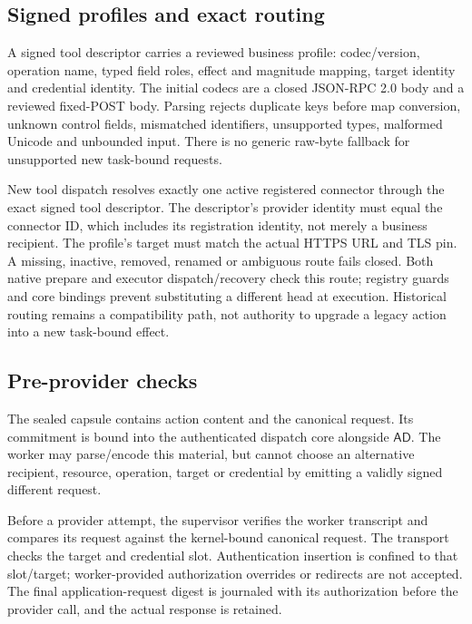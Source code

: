 \documentclass[letterpaper,twocolumn,10pt]{article}
\newcommand{\code}[1]{\texttt{\detokenize{#1}}}
\newcommand{\AD}{\ensuremath{\mathsf{AD}}}
\begin{document}
\subsection{Signed profiles and exact routing}

A signed tool descriptor carries a reviewed business profile: codec/version,
operation name, typed field roles, effect and magnitude mapping, target identity
and credential identity. The initial codecs are a closed JSON-RPC 2.0
\code{tools/call} body and a reviewed fixed-POST body. Parsing rejects duplicate
keys before map conversion, unknown control fields, mismatched identifiers,
unsupported types, malformed Unicode and unbounded input. There is no generic
raw-byte fallback for unsupported new task-bound requests.

New tool dispatch resolves exactly one active registered connector through the
exact signed tool descriptor. The descriptor's provider identity must equal
the connector ID, which includes its registration identity, not merely a
business recipient. The profile's target must match the actual HTTPS URL and
TLS pin. A missing, inactive, removed, renamed or ambiguous route fails closed.
Both native prepare and executor dispatch/recovery check this route; registry
guards and core bindings prevent substituting a different head at execution.
Historical routing remains a compatibility path, not authority to upgrade a
legacy action into a new task-bound effect.

\subsection{Pre-provider checks}

The sealed capsule contains action content and the canonical request. Its
commitment is bound into the authenticated dispatch core alongside \AD.
The worker may parse/encode this material, but cannot choose an alternative
recipient, resource, operation, target or credential by emitting a validly signed
different request.

Before a provider attempt, the supervisor verifies the worker transcript and
compares its request against the kernel-bound canonical request. The transport
checks the target and credential slot. Authentication insertion is confined to
that slot/target; worker-provided authorization overrides or redirects are not
accepted. The final application-request digest is journaled with its
authorization before the provider call, and the actual response is retained.
\end{document}
